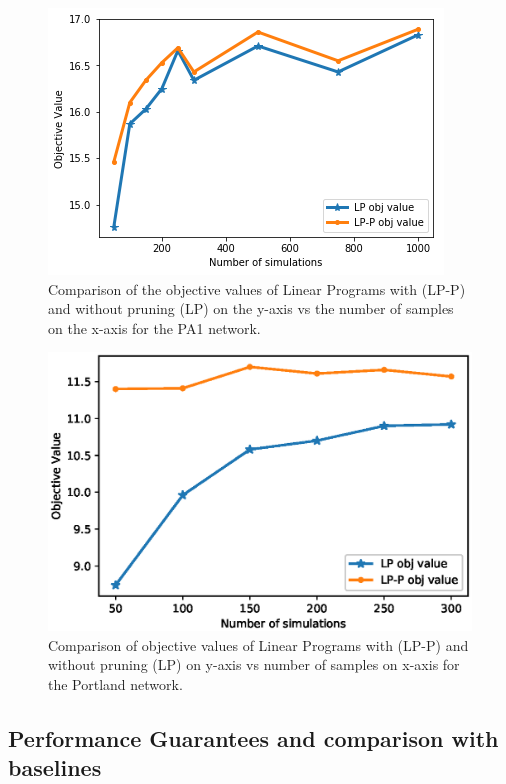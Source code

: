 \begin{figure}[!h]
    \centering
    \includegraphics[scale = 0.5]{Figuresnew/pa1_objpruning}
    \caption{Comparison of the objective values of Linear Programs with (LP-P) and without pruning (LP) on the y-axis
vs the number of samples on the x-axis for the PA1 network. }
    \label{fig:pa1pruningobj}
\end{figure}

\begin{figure}[!h]
    \centering
    \includegraphics[scale = 0.5]{Figuresnew/portland_obj.eps}
    \caption{Comparison of objective values of Linear Programs with (LP-P) and without pruning (LP) on y-axis vs 
number of samples on x-axis for the Portland network. }
    \label{fig:portlandobj}
\end{figure}

\subsection{Performance Guarantees and comparison with baselines}

